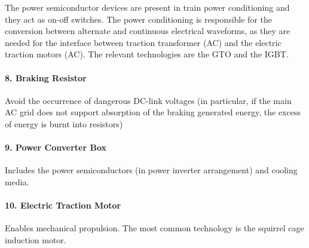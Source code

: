 	The power semiconductor devices are present in train power conditioning and they act as on-off switches. The power conditioning is responsible for the conversion between alternate and continuous  electrical waveforms, as they are needed for the interface between traction transformer (\ac{AC}) and the electric traction motors (\ac{AC}). The relevant technologies are the \ac{GTO} and the \ac{IGBT}.

\paragraph{8. Braking Resistor\\}

	Avoid the occurrence of dangerous DC-link voltages (in particular, if the main AC grid does not support absorption of the braking generated energy, the excess of energy is burnt into resistors)

\paragraph{9. Power Converter Box\\}

	Includes the power semiconductors (in power inverter arrangement) and cooling media.

\paragraph{10. Electric Traction Motor\\}

	Enables mechanical propulsion. The most common technology is the squirrel cage induction motor.




